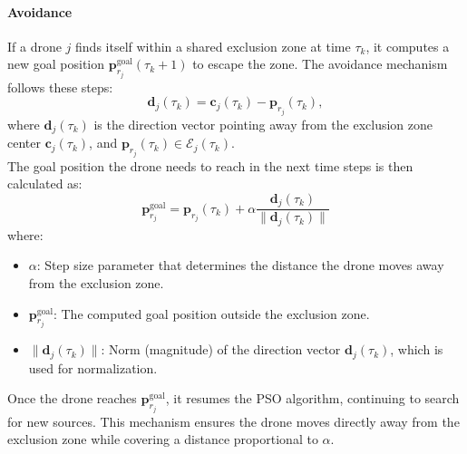 \paragraph{Avoidance}
If a drone \( j \) finds itself within a shared exclusion zone at time \( \tau_k \), 
it computes a new goal position \( \mathbf{p}_{r_j}^{\text{goal}}(\tau_k + 1) \) 
to escape the zone. The avoidance mechanism follows these steps:
\[
\mathbf{d}_j(\tau_k) = \mathbf{c}_j(\tau_k) - \mathbf{p}_{r_j}(\tau_k),
\]
where \( \mathbf{d}_j(\tau_k) \) is the direction vector pointing away 
from the exclusion zone center \( \mathbf{c}_j(\tau_k) \), and 
\( \mathbf{p}_{r_j}(\tau_k) \in \mathcal{E}_j(\tau_k) \).
\noindent\\
The goal position the drone needs to reach in the next time steps is then calculated as:
\begin{equation}
    \mathbf{p}_{r_j}^{\text{goal}} = \mathbf{p}_{r_j}(\tau_k) 
    + \alpha \frac{\mathbf{d}_j(\tau_k)}{\|\mathbf{d}_j(\tau_k)\|}
    \label{eq:move_away}
\end{equation}
where:
\begin{itemize}
    \item \( \alpha \): Step size parameter that determines 
    the distance the drone moves away from the exclusion zone.
    \item \( \mathbf{p}_{r_j}^{\text{goal}} \): The computed 
    goal position outside the exclusion zone.
    \item \( \|\mathbf{d}_j(\tau_k)\| \): Norm (magnitude) of the direction 
    vector \( \mathbf{d}_j(\tau_k) \), which is used for normalization.
\end{itemize}

Once the drone reaches \( \mathbf{p}_{r_j}^{\text{goal}} \), 
it resumes the PSO algorithm, continuing to search for new sources. 
This mechanism ensures the drone moves directly away from the 
exclusion zone while covering a distance proportional to \( \alpha \).






